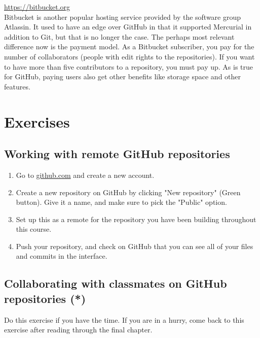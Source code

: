 \documentclass[../main/git_course_main.tex]{subfiles}
\begin{document}
\url{https://bitbucket.org} \\

Bitbucket is another popular hosting service provided by the software group Atlassin. It used to have an edge over GitHub in that it supported Mercurial in addition to Git, but that is no longer the case. The perhaps most relevant difference now is the payment model. As a Bitbucket subscriber, you pay for the number of collaborators (people with edit rights to the repositories). If you want to have more than five contributors to a repository, you must pay up. As is true for GitHub, paying users also get other benefits like storage space and other features.

\newpage
\section{Exercises}

\subsection{Working with remote GitHub repositories}

\begin{enumerate}

\item Go to \url{github.com} and create a new account.
\item Create a new repository on GitHub by clicking "New repository" (Green button). Give it a name, and make sure to pick the "Public" option.
\item Set up this as a remote for the repository you have been building throughout this course.
\item Push your repository, and check on GitHub that you can see all of your files and commits in the interface.
\end{enumerate}

\subsection{Collaborating with classmates on GitHub repositories (*)}

Do this exercise if you have the time. If you are in a hurry, come back to this exercise after reading through the final chapter.
\end{document}
